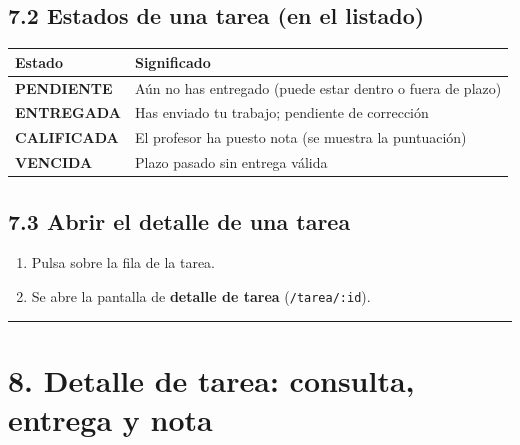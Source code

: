 \documentclass[
  spanish,
  11pt,
]{report}
\newcounter{none} %
\providecommand{\tightlist}{%
  \setlength{\itemsep}{0pt}\setlength{\parskip}{0pt}}
\begin{document}
\subsection{7.2 Estados de una tarea (en el
listado)}\label{estados-de-una-tarea-en-el-listado}

{\def\LTcaptype{none} %
\begin{longtable}[]{@{}
  >{\raggedright\arraybackslash}p{}
  >{\raggedright\arraybackslash}p{}@{}}
\toprule\noalign{}
\begin{minipage}[b]{\linewidth}\raggedright
Estado
\end{minipage} & \begin{minipage}[b]{\linewidth}\raggedright
Significado
\end{minipage} \\
\midrule\noalign{}
\endhead
\bottomrule\noalign{}
\endlastfoot
\textbf{PENDIENTE} & Aún no has entregado (puede estar dentro o fuera de
plazo) \\
\textbf{ENTREGADA} & Has enviado tu trabajo; pendiente de corrección \\
\textbf{CALIFICADA} & El profesor ha puesto nota (se muestra la
puntuación) \\
\textbf{VENCIDA} & Plazo pasado sin entrega válida \\
\end{longtable}
}

\subsection{7.3 Abrir el detalle de una
tarea}\label{abrir-el-detalle-de-una-tarea}

\begin{enumerate}
\def\labelenumi{\arabic{enumi}.}
\tightlist
\item
  Pulsa sobre la fila de la tarea.
\item
  Se abre la pantalla de \textbf{detalle de tarea}
  (\texttt{/tarea/:id}).
\end{enumerate}

\begin{center}\rule{0.5\linewidth}{0.5pt}\end{center}

\section{8. Detalle de tarea: consulta, entrega y
nota}\label{detalle-de-tarea-consulta-entrega-y-nota}
\end{document}
